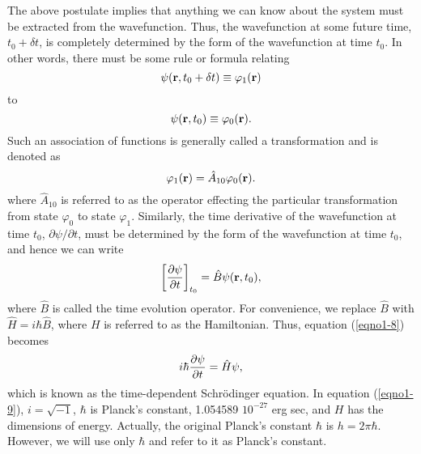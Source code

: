 The above postulate implies that anything we can know about the system
must be extracted from the wavefunction. Thus, the wavefunction at
some future time, $t_0 + \delta t$, is completely determined by the
form of the wavefunction at time $t_0$. In other words, there must be
some rule or formula relating
\begin{equation}
\psi ( {\bf r} , t_0 + \delta t ) \equiv \varphi_1 ( {\bf r} )
\end{equation}
to
\begin{equation}
\psi ( {\bf r} , t_0 ) \equiv \varphi_0 ( {\bf r} ).
\end{equation}
Such an association of functions is generally called a transformation
and is denoted as
\begin{equation}
\varphi_1 ( {\bf r} ) = {\hat{A}}_{10} \varphi_0 ( {\bf r} ).
\end{equation}
where ${\hat A}_{10}$ is referred to as the operator effecting the
particular transformation from state $\varphi_0$ to state $\varphi_1$.
Similarly, the time derivative of the wavefunction at time $t_0$,
$\partial \psi / \partial t$, must be determined by the form of the
wavefunction at time $t_0$, and hence we can write
\begin{equation}
\left[ {\partial \psi \over \partial t} \right]_{t_0} = {\hat B} \psi ( 
{\bf r} , t_0 ),
\label{eqno1-8}
\end{equation}
where ${\hat B}$ is called the time evolution operator.  For
convenience, we replace ${\hat B}$ with ${\hat H} = i \hbar {\hat B}$,
where $H$ is referred to as the Hamiltonian.  Thus, equation
(\ref{eqno1-8}) becomes
\begin{equation}
i \hbar {\partial \psi \over \partial t} = {\hat H} \psi ,
\label{eqno1-9}
\end{equation}
which is known as the time-dependent Schr\"odinger equation.  In
equation (\ref{eqno1-9}), $i = \sqrt{-1}$, $\hbar$ is Planck's
constant, 1.054589 $10^{-27}$ erg sec, and $H$ has the dimensions of
energy. Actually, the original Planck's constant $\hbar$ is $h = 2 \pi
\hbar$.  However, we will use only $\hbar$ and refer to it as Planck's
constant.

